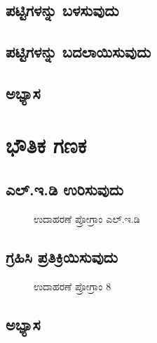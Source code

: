 \documentclass[16pt]{book}
\begin{document}
\section{ಪಟ್ಟಿಗಳನ್ನು ಬಳಸುವುದು}

\section{ಪಟ್ಟಿಗಳನ್ನು ಬದಲಾಯಿಸುವುದು} 

\section{ಅಭ್ಯಾಸ }

\chapter{ಭೌತಿಕ ಗಣಕ}

\section{ಎಲ್.ಇ.ಡಿ ಉರಿಸುವುದು}
\begin{figure}[h]
\caption{ಉದಾಹರಣೆ ಪ್ರೋಗ್ರಾಂ ಎಲ್.ಇ.ಡಿ}
\end{figure}

\section{ಗ್ರಹಿಸಿ ಪ್ರತಿಕ್ರಿಯಿಸುವುದು} 
\begin{figure}[h]
\begin{Scratch}[1]
\beginbox{}
\end{Scratch}
\caption{ಉದಾಹರಣೆ ಪ್ರೋಗ್ರಾಂ 8}
\end{figure}

\section{ಅಭ್ಯಾಸ }
\end{document}

